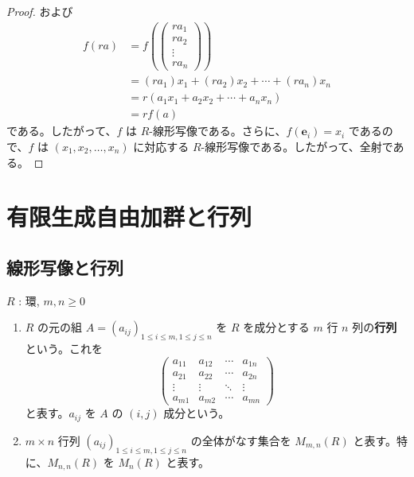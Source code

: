 \documentclass[article,paper=a4paper]{jlreq}
\begin{document}
\begin{proof}
      および
      \begin{align*}
        f(ra) &= f\left(\begin{pmatrix}ra_1 \\ ra_2 \\ \vdots \\ ra_n\end{pmatrix}\right) \\  
        &= (ra_1)x_1 + (ra_2)x_2 + \cdots + (ra_n)x_n \\
        &= r(a_1x_1 + a_2x_2 + \cdots + a_nx_n) \\
        &= rf(a)
      \end{align*}
      である。したがって、$f$ は $R$-\hspace{0pt}線形写像である。さらに、$f(\mathbf{e}_i) = x_i$ であるので、$f$ は $(x_1, x_2, \ldots, x_n)$ に対応する $R$-\hspace{0pt}線形写像である。したがって、全射である。
\end{proof}

\section{有限生成自由加群と行列}

\subsection{線形写像と行列}

\begin{dfn}
  \quad $R$ : 環, $m, n \geq 0$
  \begin{enumerate}[label=(\arabic*)\,]
    \item $R$ の元の組 $A = (a_{ij})_{1 \leq i \leq m, 1 \leq j \leq n}$ を $R$ を成分とする $m$ 行 $n$ 列の\textbf{行列}という。これを
     \[
       \begin{pmatrix}
         a_{11} & a_{12} & \cdots & a_{1n} \\
         a_{21} & a_{22} & \cdots & a_{2n} \\
         \vdots & \vdots & \ddots & \vdots \\
         a_{m1} & a_{m2} & \cdots & a_{mn}
       \end{pmatrix}
     \]
     と表す。$a_{ij}$ を $A$ の $(i, j)$ 成分という。
    \item $m \times n$ 行列 $(a_{ij})_{1 \leq i \leq m, 1 \leq j \leq n}$ の全体がなす集合を $M_{m, n}(R)$ と表す。特に、$M_{n, n}(R)$ を $M_n(R)$ と表す。
  \end{enumerate}
\end{dfn}
\end{document}
